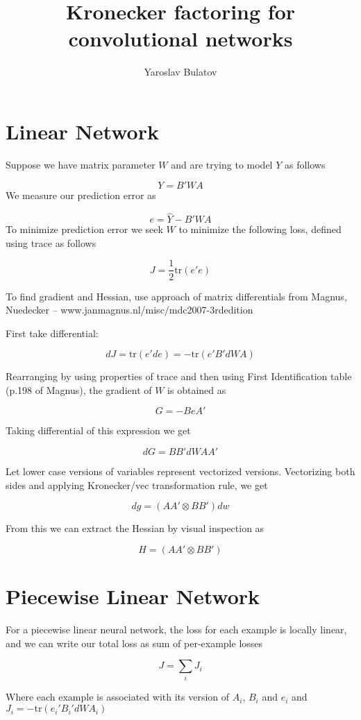 \documentclass{article}
\begin{document}
\title{Kronecker factoring for convolutional networks}
\author{Yaroslav Bulatov}

\maketitle
\section*{Linear Network}
Suppose we have matrix parameter $W$ and are trying to model $Y$ as follows

$$Y = B'W A$$
We measure our prediction error as

$$e = \hat{Y}-B'WA$$
To minimize prediction error we seek $W$ to minimize the following loss, defined using trace as follows

$$J = \frac{1}{2}\text{tr}(e'e)$$

To find gradient and Hessian, use approach of matrix differentials from Magnus, Nuedecker -- www.janmagnus.nl/misc/mdc2007-3rdedition

First take differential:

$$dJ = \text{tr}(e'de) = -\text{tr}(e'B'dWA)$$

Rearranging by using properties of trace and then using First Identification table (p.198 of Magnus), the gradient of $W$ is obtained as

$$G=-BeA'$$

Taking differential of this expression we get

$$dG = BB'dW AA'$$

Let lower case versions of variables represent vectorized versions. Vectorizing both sides and applying Kronecker/vec transformation rule, we get

$$dg = (AA'\otimes BB')dw$$

From this we can extract the Hessian by visual inspection as

$$H = (AA'\otimes BB')$$

\section*{Piecewise Linear Network}
For a piecewise linear neural network, the loss for each example is locally linear, and we can write our total loss as sum of per-example losses

$$J = \sum_i J_i$$

Where each example is associated with its version of $A_i$, $B_i$ and $e_i$ and $J_i = -\text{tr}(e_i'B_i'dWA_i)$
\end{document}
